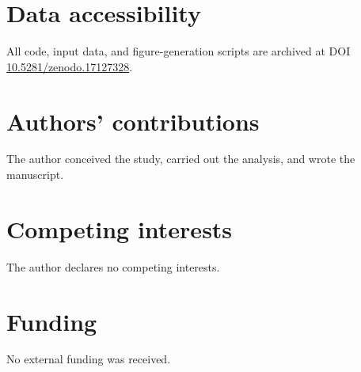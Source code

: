 
\section*{Data accessibility}
All code, input data, and figure-generation scripts are archived at DOI \href{https://doi.org/10.5281/zenodo.17127328}{10.5281/zenodo.17127328}.

\section*{Authors’ contributions}
The author conceived the study, carried out the analysis, and wrote the manuscript.

\section*{Competing interests}
The author declares no competing interests.

\section*{Funding}
No external funding was received.

